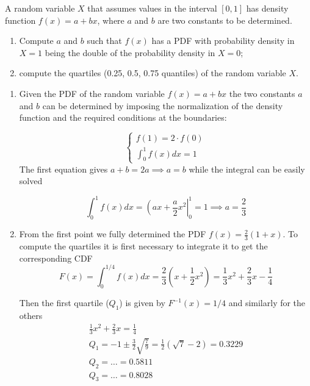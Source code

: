 \begin{question}
A random variable $X$ that assumes values in the interval $[0, 1]$ has density function $f(x) = a + b x$,
where $a$ and $b$ are two constants to be determined.

\begin{enumerate}[label={\emph{\alph*})}]
\tightlist
\item Compute $a$ and $b$ such that $f(x)$ has a PDF with probability density in $X = 1$ being the double of the probability density in $X = 0$;
\item compute the quartiles (0.25, 0.5, 0.75 quantiles) of the random variable $X$.
\end{enumerate}
\end{question}

\begin{solution}
\begin{enumerate}[label={\emph{\alph*})}]
\tightlist
\item Given the PDF of the random variable $f(x) = a + bx$ the two constants $a$ and $b$ can be determined by imposing the normalization of the density function and the required conditions at the boundaries:

\begin{equation*}
\begin{cases}
	f(1) = 2\cdot f(0)\\
	\int_0^1 f(x)dx = 1
\end{cases}  
\end{equation*}
The first equation gives $a+b = 2a \implies a = b$ while the integral can be easily solved

\begin{equation*}
\int_0^1 f(x)dx = \left(ax + \frac{a}{2}x^2\right|^1_0 = 1 \implies a = \frac{2}{3}
\end{equation*}

\item From the first point we fully determined the PDF $f(x) = \frac{2}{3}(1 + x)$. To compute the quartiles it is first necessary to integrate it to get the corresponding CDF 
\begin{equation*}
F(x) = \int_0^{1/4} f(x)dx = \frac{2}{3}\left(x + \frac{1}{2}x^2\right) = \frac{1}{3}x^2 + \frac{2}{3} x  - \frac{1}{4}
\end{equation*}

Then the first quartile ($Q_1$) is given by $F^{-1}(x) = 1/4$ and similarly for the others
\begin{gather*}
\frac{1}{3}x^2 + \frac{2}{3} x  = \frac{1}{4} \\
Q_1 = -1 \pm \frac{3}{2}\sqrt{\frac{7}{9}} = \frac{1}{2}(\sqrt{7} - 2) = 0.3229\\
Q_2 = \dots = 0.5811\\
Q_3 = \dots = 0.8028
\end{gather*}
\end{enumerate}
\end{solution}

